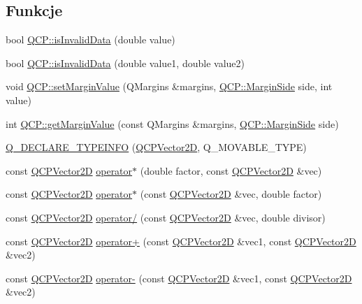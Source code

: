\subsection*{Funkcje}
\begin{DoxyCompactItemize}
\item 
bool \hyperlink{namespace_q_c_p_a07ab701c05329089f933b9cae2638a63}{Q\+C\+P\+::is\+Invalid\+Data} (double value)
\item 
bool \hyperlink{namespace_q_c_p_a728903e5c3dd17847bee280f4005496f}{Q\+C\+P\+::is\+Invalid\+Data} (double value1, double value2)
\item 
void \hyperlink{namespace_q_c_p_afbf6e3084c108f2bb4372107945ee82f}{Q\+C\+P\+::set\+Margin\+Value} (Q\+Margins \&margins, \hyperlink{namespace_q_c_p_a7e487e3e2ccb62ab7771065bab7cae54}{Q\+C\+P\+::\+Margin\+Side} side, int value)
\item 
int \hyperlink{namespace_q_c_p_a23a2679d3495c444acc26acc61e35b5b}{Q\+C\+P\+::get\+Margin\+Value} (const Q\+Margins \&margins, \hyperlink{namespace_q_c_p_a7e487e3e2ccb62ab7771065bab7cae54}{Q\+C\+P\+::\+Margin\+Side} side)
\item 
\hyperlink{qcustomplot_8hh_accbe1a1a6b69d3db3f495f66375f7301}{Q\+\_\+\+D\+E\+C\+L\+A\+R\+E\+\_\+\+T\+Y\+P\+E\+I\+N\+FO} (\hyperlink{class_q_c_p_vector2_d}{Q\+C\+P\+Vector2D}, Q\+\_\+\+M\+O\+V\+A\+B\+L\+E\+\_\+\+T\+Y\+PE)
\item 
const \hyperlink{class_q_c_p_vector2_d}{Q\+C\+P\+Vector2D} \hyperlink{qcustomplot_8hh_aa75268fb64b9eaee5448fb815007bee9}{operator$\ast$} (double factor, const \hyperlink{class_q_c_p_vector2_d}{Q\+C\+P\+Vector2D} \&vec)
\item 
const \hyperlink{class_q_c_p_vector2_d}{Q\+C\+P\+Vector2D} \hyperlink{qcustomplot_8hh_aace10d28a76e84e7380ede1a9cb58274}{operator$\ast$} (const \hyperlink{class_q_c_p_vector2_d}{Q\+C\+P\+Vector2D} \&vec, double factor)
\item 
const \hyperlink{class_q_c_p_vector2_d}{Q\+C\+P\+Vector2D} \hyperlink{qcustomplot_8hh_aa69909afc8c656999a2ea292ea01244b}{operator/} (const \hyperlink{class_q_c_p_vector2_d}{Q\+C\+P\+Vector2D} \&vec, double divisor)
\item 
const \hyperlink{class_q_c_p_vector2_d}{Q\+C\+P\+Vector2D} \hyperlink{qcustomplot_8hh_a24cc5985429b12dbed4d0d3c5a917d20}{operator+} (const \hyperlink{class_q_c_p_vector2_d}{Q\+C\+P\+Vector2D} \&vec1, const \hyperlink{class_q_c_p_vector2_d}{Q\+C\+P\+Vector2D} \&vec2)
\item 
const \hyperlink{class_q_c_p_vector2_d}{Q\+C\+P\+Vector2D} \hyperlink{qcustomplot_8hh_a9e01331d8debf0877ee4cba9abd83605}{operator-\/} (const \hyperlink{class_q_c_p_vector2_d}{Q\+C\+P\+Vector2D} \&vec1, const \hyperlink{class_q_c_p_vector2_d}{Q\+C\+P\+Vector2D} \&vec2)

\end{DoxyCompactItemize}
